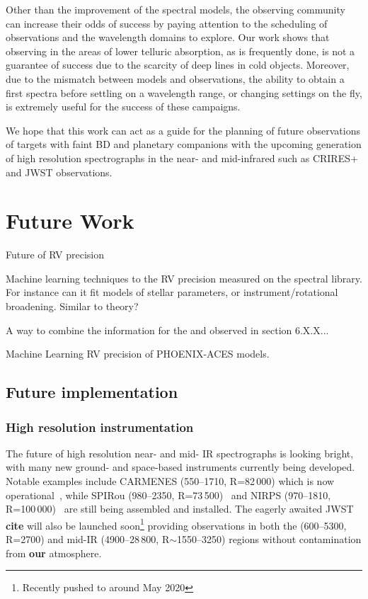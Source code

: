 Other than the improvement of the spectral models, the observing community can increase their odds of success by paying attention to the scheduling of observations and the wavelength domains to explore.
Our work shows that observing in the areas of lower telluric absorption, as is frequently done, is not a guarantee of success due to the scarcity of deep lines in cold objects.
Moreover, due to the mismatch between models and observations, the ability to obtain a first spectra before settling on a wavelength range, or changing settings on the fly, is extremely useful for the success of these campaigns.

We hope that this work can act as a guide for the planning of future observations of targets with faint {BD} and planetary companions with the upcoming generation of high resolution spectrographs in the near- and mid-infrared such as {CRIRES+} and JWST observations.





\section{Future Work}

Future of {RV} precision

Machine learning techniques to the RV precision measured on the spectral library.
For instance can it fit models of stellar parameters, or instrument/rotational broadening.
Similar to theory?


A way to combine the information for the \Logg{} and \feh{} observed in section 6.X.X...


Machine Learning RV precision of {PHOENIX-ACES} models.







\subsection{Future implementation}
\label{subsec:future}
\subsubsection{High resolution instrumentation}
\label{subsubsec:highres}
The future of high resolution near- and mid- IR spectrographs is looking bright, with many new ground- and space-based instruments currently being developed.
Notable examples include CARMENES (550--1710\nm{},  R=82\,000) which is now operational~\citep{quirrenbach_carmenes_2014}, while SPIRou (980--2350\nm{},  R=73\,500)~\cite{artigau_spirou_2014} and NIRPS (970--1810\nm{}, R=100\,000)~\cite{bouchy_nearinfrared_2017} are still being assembled and installed.
The eagerly awaited {JWST} \textbf{cite} will also be launched soon\footnote{Recently pushed to around May 2020} providing observations in both the \nir{} (600--5300\nm{}, R=2700) and mid-IR (4900--28\,800\nm{}, R$\sim$1550--3250) regions without contamination from \textbf{our} atmosphere.

